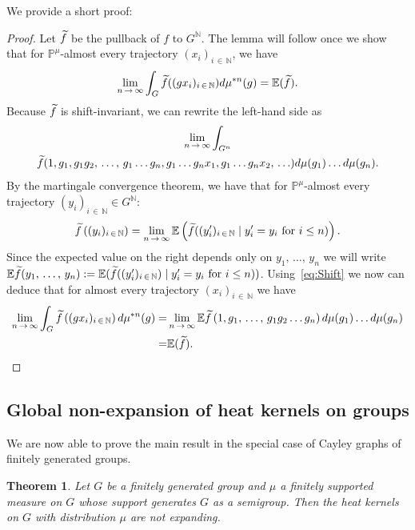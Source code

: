 \documentclass[10pt]{amsart}
\newtheorem{theo}{Theorem}[section]
\theoremstyle{definition}\newtheorem{defi}[theo]{Definition}\newtheorem{rema}[theo]{Remark}\newtheorem{exam}[theo]{Example}\newtheorem{exem}[theo]{Example}\newtheorem{nota}[theo]{Notation}
\newcommand{\bbN}{\mathbb{N}}
\newcommand{\bbE}{\mathbb{E}}
\newcommand{\bbP}{\mathbb{P}}
\let\oldtilde\tilde
\renewcommand*{\tilde}[1]{\mathchoice{\widetilde{#1}}{\widetilde{#1}}{\oldtilde{#1}}{\oldtilde{#1}}}
\begin{document}
We provide a short proof:

\begin{proof}
Let $\tilde f$ be the pullback of $f$ to $G^\bbN$. The lemma will follow once we show that for $\bbP^\mu$-almost every trajectory $(x_i)_{i\,\in\,\bbN}$, we have
\[
\lim_{n\,\to\,\infty}\int_G \tilde f((gx_i)_{i\,\in\,\bbN})d\mu^{\ast n}(g)=\bbE(\tilde f).
\]
Because $\tilde f$ is shift-invariant, we can rewrite the left-hand side as
\begin{multline}\label{eq:Shift}
\lim_{n\,\to\,\infty}\int_{G^n}\\ \tilde f(1,g_1,g_1g_2,\,\ldots,\,g_1\ldots g_n,g_1\ldots g_nx_1,g_1\ldots g_nx_2,\,\ldots) d\mu(g_1)\ldots d\mu(g_n).
\end{multline}
By the martingale convergence theorem, we have that for $\bbP^\mu$-almost every trajectory $(y_i)_{i\,\in\,\bbN}\in G^\bbN$:
\[
\tilde{f}\left((y_i)_{i\,\in\,\bbN}\right)=\lim_{n\,\to\,\infty}\bbE\left(\tilde f((y_i')_{i\,\in\,\bbN} \mid y_i'=y_i \text{ for } i\leq n)\right).
\]
Since the expected value on the right depends only on $y_1,\,\ldots,\,y_n$ we will write $\bbE \tilde f(y_1,\,\ldots,\,y_n):=\bbE(\tilde f((y_i')_{i\,\in\,\bbN}) \mid y_i'=y_i \text{ for } i\leq n))$. Using~\eqref{eq:Shift} we now can deduce that for almost every trajectory $(x_i)_{i\,\in\,\bbN}$ we have
\begin{align*}
\lim_{n\,\to\,\infty}\int_G \tilde f\left((gx_i)_{i\,\in\,\bbN}\right)d\mu^{\ast n}(g)=&\lim_{n\,\to\,\infty}\bbE \tilde{f}\left(1,g_1,\,\ldots,\,g_1g_2\ldots g_n\right)d\mu(g_1)\ldots d\mu(g_n)\\=&\bbE(\tilde f).
\end{align*}
\end{proof}

\subsection{Global non-expansion of heat kernels on groups} 

We are now able to prove the main result in the special case of Cayley graphs of finitely generated groups.

\begin{theo}\label{thm:mainGp}
Let $G$ be a finitely generated group and $\mu$ a finitely supported measure on $G$ whose support generates $G$ as a semigroup. Then the heat kernels on $G$ with distribution $\mu$ are not expanding.
\end{theo}
\end{document}
